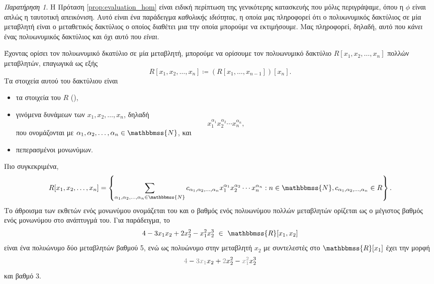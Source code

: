 \documentclass[12pt,a4paper,reqno]{amsart}
\makeatletter
\theoremstyle{definition}
\theoremstyle{remark}
\newtheorem*{remark}{Παρατήρηση}
\numberwithin{theorem}{section}
\numberwithin{exercise}{section}
\numberwithin{equation}{section}
\newcommand{\NN}{\mathbbmss{N}}
\newcommand{\RR}{\mathbbmss{R}}
\newcommand{\defn}[1]{{\color{mylightblue}{#1}}}
\def\mathcolor#1#{\@mathcolor{#1}}
\def\@mathcolor#1#2#3{%
  \protect\leavevmode
  \begingroup
    \color#1{#2}#3%
  \endgroup
}
\makeatother
\begin{document}
\begin{remark}
    Η Πρόταση \ref{prop:evaluation_hom} είναι ειδική περίπτωση της γενικότερης κατασκευής που μόλις περιγράψαμε, όπου η $\phi$ είναι απλώς η ταυτοτική απεικόνιση. Αυτό είναι ένα παράδειγμα \emph{καθολικής ιδιότητας}, η οποία μας πληροφορεί ότι ο πολυωνυμικός δακτύλιος σε μία μεταβλητή είναι ο  μεταθετικός δακτύλιος ο οποίος διαθέτει μια  την οποία μπορούμε να εκτιμήσουμε. Μας πληροφορεί, δηλαδή, αυτό που \emph{κάνει} ένας πολυωνυμικός δακτύλιος και όχι αυτό που \emph{είναι}.
\end{remark}

Έχοντας ορίσει τον πολυωνυμικό δκατύλιο σε μία μεταβλητή, μπορούμε να ορίσουμε τον πολυωνυμικό δακτύλιο $R[x_1, x_2, \dots, x_n]$ πολλών μεταβλητών, επαγωγικά ως εξής 
\[
R[x_1, x_2, \dots, x_n] \coloneqq \left(R[x_1, \dots, x_{n-1}]\right)[x_n].
\]
Τα στοιχεία αυτού του δακτύλιου είναι 
\begin{itemize}
    \item τα στοιχεία του $R$ (\defn{σταθερά πολυώνυμα}),
    \item γινόμενα δυνάμεων των $x_1, x_2, \dots, x_n$, δηλαδή
    \[
    x_1^{\alpha_1}x_2^{\alpha_2}\cdots x_n^{\alpha_n},
    \]
    που ονομάζονται \defn{μονώνυμα} με \defn{εκθέτες} $\alpha_1, \alpha_2, \dots, \alpha_n \in \NN$, και
    \item πεπερασμένοι  μονωνύμων.
\end{itemize}

Πιο συγκεκριμένα, 
\[
R[x_1, x_2, \dots, x_n] = 
\left\{
    \sum_{\alpha_1, \alpha_2, \dots, \alpha_n \in \NN} c_{\alpha_1, \alpha_2, \dots, \alpha_n} x_1^{\alpha_1}x_2^{\alpha_2}\cdots x_n^{\alpha_n} : n \in \NN, c_{\alpha_1, \alpha_2, \dots, \alpha_n} \in R
\right\}.
\]
Το άθροισμα των εκθετών ενός μονωνύμου ονομάζεται \defn{βαθμός} του και ο βαθμός ενός πολυω\-νύμου πολλών μεταβλητών ορίζεται ως ο μέγιστος βαθμός ενός μονωνύμου στο ανάπτυγμά του. Για παράδειγμα, το 
\[
4 - 3x_1x_2 + 2x_2^2 - x_1^2x_2^3 \ \in \ \RR[x_1,x_2]
\]
είναι ένα πολυώνυμο δύο μεταβλητών βαθμού 5, ενώ ως πολυώνυμο στην μεταβλητή $x_2$ με συντελεστές στο $\RR[x_1]$ έχει την μορφή 
\[
\mathcolor{gray}{4} - \mathcolor{gray}{3x_1}x_2 + \mathcolor{gray}{2}x_2^2 - \mathcolor{gray}{x_1^2}x_2^3
\]
και βαθμό 3.
\end{document}
